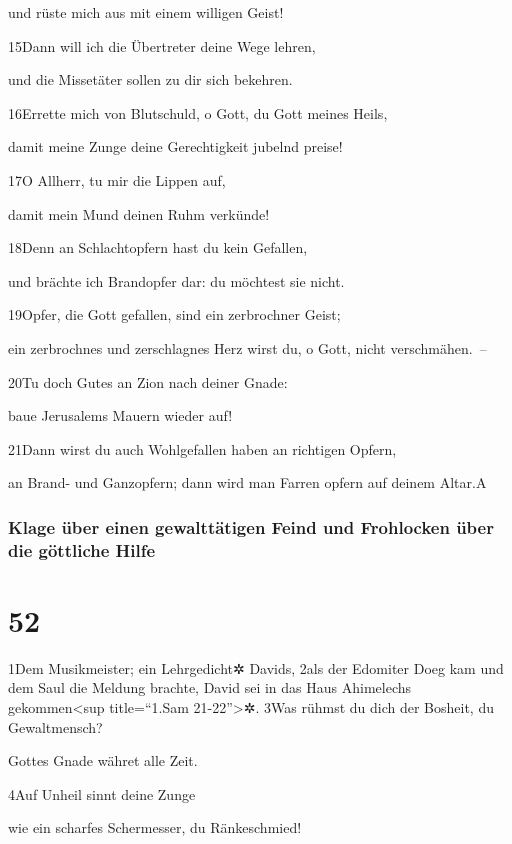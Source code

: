 und rüste mich aus mit einem willigen Geist!

15Dann will ich die Übertreter deine Wege lehren,

und die Missetäter sollen zu dir sich bekehren.

16Errette mich von Blutschuld, o Gott, du Gott meines Heils,

damit meine Zunge deine Gerechtigkeit jubelnd preise!

17O Allherr, tu mir die Lippen auf,

damit mein Mund deinen Ruhm verkünde!

18Denn an Schlachtopfern hast du kein Gefallen,

und brächte ich Brandopfer dar: du möchtest sie nicht.

19Opfer, die Gott gefallen, sind ein zerbrochner Geist;

ein zerbrochnes und zerschlagnes Herz wirst du, o Gott, nicht
verschmähen.~--

20Tu doch Gutes an Zion nach deiner Gnade:

baue Jerusalems Mauern wieder auf!

21Dann wirst du auch Wohlgefallen haben an richtigen Opfern,

an Brand- und Ganzopfern; dann wird man Farren opfern auf deinem
Altar.{A}

\hypertarget{klage-uxfcber-einen-gewalttuxe4tigen-feind-und-frohlocken-uxfcber-die-guxf6ttliche-hilfe}{%
\subsubsection{Klage über einen gewalttätigen Feind und Frohlocken über
die göttliche
Hilfe}\label{klage-uxfcber-einen-gewalttuxe4tigen-feind-und-frohlocken-uxfcber-die-guxf6ttliche-hilfe}}

\hypertarget{section-51}{%
\section{52}\label{section-51}}

1Dem Musikmeister; ein Lehrgedicht✲ Davids, 2als der Edomiter Doeg kam
und dem Saul die Meldung brachte, David sei in das Haus Ahimelechs
gekommen\textless sup title=``1.Sam 21-22''\textgreater✲. 3Was rühmst du
dich der Bosheit, du Gewaltmensch?

Gottes Gnade währet alle Zeit.

4Auf Unheil sinnt deine Zunge

wie ein scharfes Schermesser, du Ränkeschmied!

